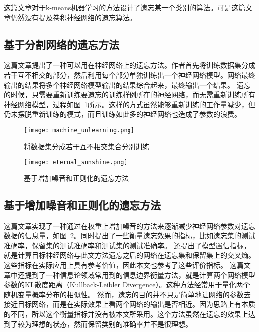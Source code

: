 这篇文章\cite{antonio2019}对于k-means机器学习的方法设计了遗忘某一个类别的算法。可是这篇文章仍然没有提及卷积神经网络的遗忘算法。

\subsection{基于分割网络的遗忘方法}
这篇文章\cite{2019arXiv191203817B}提出了一种可以用在神经网络上的遗忘方法。作者首先将训练数据集分成若干互不相交的部分，然后利用每个部分单独训练出一个神经网络模型。网络最终输出的结果将多个神经网络模型输出的结果综合起来，最终输出一个结果。
遗忘的时候，只需要重新训练要遗忘的训练样例所在的神经网络，而无需重新训练所有神经网络模型，过程如图~\ref{fig:machine_unlearning}所示。这样的方式虽然能够重新训练的工作量减少，但仍未摆脱重新训练的模式，而且训练如此多的神经网络也造成了参数的浪费。
\begin{figure}
    \centering
    \texttt{[image: machine\_unlearning.png]}
    \caption{将数据集分成若干互不相交集合分别训练\cite{2019arXiv191203817B}}
    \label{fig:machine_unlearning}
\end{figure}
\begin{figure}
    \centering
    \texttt{[image: eternal\_sunshine.png]}
    \caption{基于增加噪音和正则化的遗忘方法\cite{2019arXiv191203817B}}
    \label{fig:eternal_sunshine}
\end{figure}
\subsection{基于增加噪音和正则化的遗忘方法}
这篇文章\cite{Golatkar_2020_CVPR}实现了一种通过在权重上增加噪音的方法来逐渐减少神经网络参数对遗忘数据的信息量，如图~\ref{fig:eternal_sunshine}。同时提出了一些衡量遗忘效果的指标，比如遗忘集的测试准确率，保留集的测试准确率和测试集的测试准确率。
还提出了模型置信指标，就是计算目标神经网络与此文方法遗忘之后的网络在遗忘集和保留集上的交叉熵。这些指标在实际应用上具有参考价值，因此本文也参考了这些评价指标。
这篇文章中还提到了一种信息论领域常用到的信息边界衡量方法，就是计算两个网络模型参数的KL散度距离（Kullback-Leibler Divergence）。这种方法经常用于量化两个随机变量概率分布的相似性。
然而，遗忘的目的并不只是简单地让网络的参数去接近目标网络，而是在实际效果上看两个网络的输出是否相近。因为思路上有本质的不同，所以这个衡量指标并没有被本文所采用。这个方法虽然在遗忘的效果上达到了较为理想的状态，然而保留类别的准确率并不是很理想。

